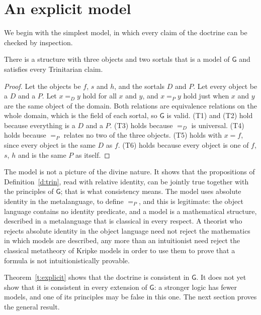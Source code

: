 \documentclass{situationist-preprint}
\begin{document}
\section{An explicit model}

We begin with the simplest model, in which every claim of the doctrine can be checked by inspection.

\begin{theorem}\label{t:explicit}
There is a structure with three objects and two sortals that is a model of $\mathsf{G}$ and satisfies every Trinitarian claim.
\end{theorem}

\begin{proof}
Let the objects be $f$, $s$ and $h$, and the sortals $D$ and $P$. Let every object be a $D$ and a $P$. Let $x =_D y$ hold for all $x$ and $y$, and $x =_P y$ hold just when $x$ and $y$ are the same object of the domain. Both relations are equivalence relations on the whole domain, which is the field of each sortal, so $\mathsf{G}$ is valid. (T1) and (T2) hold because everything is a $D$ and a $P$. (T3) holds because $=_D$ is universal. (T4) holds because $=_P$ relates no two of the three objects. (T5) holds with $x = f$, since every object is the same $D$ as $f$. (T6) holds because every object is one of $f$, $s$, $h$ and is the same $P$ as itself.
\end{proof}

The model is not a picture of the divine nature. It shows that the propositions of Definition~\ref{d:trin}, read with relative identity, can be jointly true together with the principles of $\mathsf{G}$; that is what consistency means. The model uses absolute identity in the metalanguage, to define $=_P$, and this is legitimate: the object language contains no identity predicate, and a model is a mathematical structure, described in a metalanguage that is classical in every respect. A theorist who rejects absolute identity in the object language need not reject the mathematics in which models are described, any more than an intuitionist need reject the classical metatheory of Kripke models in order to use them to prove that a formula is not intuitionistically provable.

Theorem~\ref{t:explicit} shows that the doctrine is consistent in $\mathsf{G}$. It does not yet show that it is consistent in every extension of $\mathsf{G}$: a stronger logic has fewer models, and one of its principles may be false in this one. The next section proves the general result.
\end{document}
